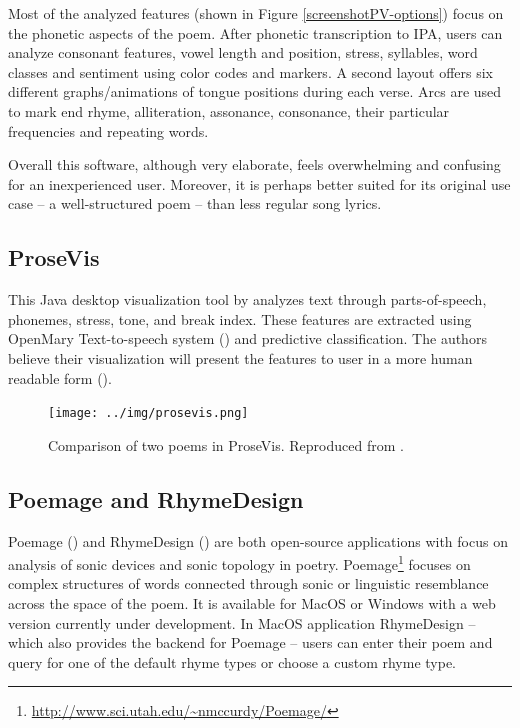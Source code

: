 Most of the analyzed features (shown in Figure \ref{screenshotPV-options}) focus on the phonetic aspects of the poem. After phonetic transcription to IPA, users can analyze consonant features, vowel length and position, stress, syllables, word classes and sentiment using color codes and markers. A second layout offers six different graphs/animations of tongue positions during each verse. Arcs are used to mark end rhyme, alliteration, assonance, consonance, their particular frequencies and repeating words.


Overall this software, although very elaborate, feels overwhelming and confusing for an inexperienced user. Moreover, it is perhaps better suited for its original use case -- a well-structured poem -- than less regular song lyrics.


\subsection*{ProseVis}
This Java desktop visualization tool by \cite{Clement2013} analyzes text through
parts-of-speech, phonemes, stress, tone, and break index. These features are extracted using OpenMary Text-to-speech system (\cite{Schroder2006}) and predictive classification. The authors believe their visualization will present the features to user in a more human readable form (\cite{prosevis2017sourceforge}).

\begin{figure}[h]\centering
	\texttt{[image: ../img/prosevis.png]}
	\caption[Comparison of two poems in ProseVis]{Comparison of two poems in ProseVis. Reproduced from \cite{prosevis2017sourceforge}.}\label{screenshotProsevis}
\end{figure}

\subsection*{Poemage and RhymeDesign}
Poemage (\cite{McCurdy2015poemage}) and RhymeDesign (\cite{McCurdy2015}) are both open-source applications with focus on analysis of sonic devices and sonic topology in poetry. Poemage\footnote{\url{http://www.sci.utah.edu/~nmccurdy/Poemage/}} focuses on complex structures of words connected through sonic or linguistic resemblance across the space of the poem. It is available for MacOS or Windows with a web version currently under development. In MacOS application RhymeDesign -- which also provides the backend for Poemage -- users can enter their poem and query for one of the default rhyme types or choose a custom rhyme type.

